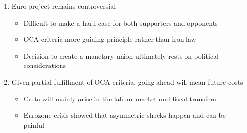 \documentclass{beamer}
\begin{document}
\begin{frame}
\begin{table}[!h] \centering \caption{Scorecard for the OCA criteria} \label{table:summary}
\end{table}
\end{frame}

\begin{frame}
  \begin{enumerate}
  \item Euro project remains controversial
  \begin{itemize}
    \item Difficult to make a hard case for both supporters and opponents
    \item OCA criteria more guiding principle rather than iron law
    \item Decision to create a monetary union ultimately rests on political considerations
  \end{itemize}
  \medskip
  \item Given partial fulfillment of OCA criteria, going ahead will mean future costs
  \begin{itemize}
    \item Costs will mainly arise in the labour market and fiscal transfers
    \item Eurozone crisis showed that asymmetric shocks happen and can be painful
  \end{itemize}
\end{enumerate}
\end{frame}

\end{document}
